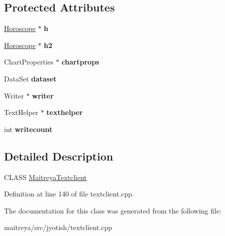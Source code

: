 \subsection*{Protected Attributes}
\begin{DoxyCompactItemize}
\item 
\hypertarget{classMaitreyaTextclient_a2f021ae6a2c01a71403c18cd250459b0}{\hyperlink{structHoroscope}{Horoscope} $\ast$ {\bfseries h}}\label{classMaitreyaTextclient_a2f021ae6a2c01a71403c18cd250459b0}

\item 
\hypertarget{classMaitreyaTextclient_ad4201d461abb62a98ca2b822e7f44e4c}{\hyperlink{structHoroscope}{Horoscope} $\ast$ {\bfseries h2}}\label{classMaitreyaTextclient_ad4201d461abb62a98ca2b822e7f44e4c}

\item 
\hypertarget{classMaitreyaTextclient_a0d0f0f7884843d2574def9982fc22776}{Chart\-Properties $\ast$ {\bfseries chartprops}}\label{classMaitreyaTextclient_a0d0f0f7884843d2574def9982fc22776}

\item 
\hypertarget{classMaitreyaTextclient_afc793b19b9ed9ac7222730460c540282}{Data\-Set {\bfseries dataset}}\label{classMaitreyaTextclient_afc793b19b9ed9ac7222730460c540282}

\item 
\hypertarget{classMaitreyaTextclient_a58d0d504e8f4bb174ea81e4baab469f8}{Writer $\ast$ {\bfseries writer}}\label{classMaitreyaTextclient_a58d0d504e8f4bb174ea81e4baab469f8}

\item 
\hypertarget{classMaitreyaTextclient_ab87b35fa9d20084c483baa89faeb3cb3}{Text\-Helper $\ast$ {\bfseries texthelper}}\label{classMaitreyaTextclient_ab87b35fa9d20084c483baa89faeb3cb3}

\item 
\hypertarget{classMaitreyaTextclient_a32394ed9a19a1e447d778791b88ee0ab}{int {\bfseries writecount}}\label{classMaitreyaTextclient_a32394ed9a19a1e447d778791b88ee0ab}

\end{DoxyCompactItemize}


\subsection{Detailed Description}
C\-L\-A\-S\-S \hyperlink{classMaitreyaTextclient}{Maitreya\-Textclient} 

Definition at line 140 of file textclient.\-cpp.



The documentation for this class was generated from the following file\-:\begin{DoxyCompactItemize}
\item 
maitreya/src/jyotish/textclient.\-cpp\end{DoxyCompactItemize}
